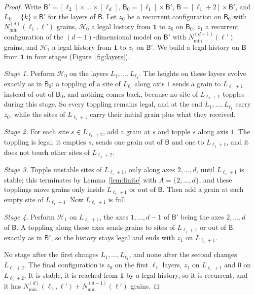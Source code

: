 \documentclass[11pt]{amsart}
\theoremstyle{definition}
\newcommand{\one}{\mathbf 1}
\newcommand{\Nmin}{N_{\min}}
\newcommand{\B}{\mathsf B}
\begin{document}
\begin{proof}
Write $\B'=[\ell_2]\times\dots\times[\ell_d]$, $\B_0=[\ell_1]\times\B'$, $\B=[\ell_1+2]\times\B'$, and $L_k=\{k\}\times\B'$ for the layers of $\B$. Let $z_0$ be a recurrent configuration on $\B_0$ with $\Nmin^{(d)}(\ell_1,\ell')$ grains, $\mathcal H_0$ a legal history from $\one$ to $z_0$ on $\B_0$, $z_1$ a recurrent configuration of the $(d-1)$-dimensional model on $\B'$ with $\Nmin^{(d-1)}(\ell')$ grains, and $\mathcal H_1$ a legal history from $\one$ to $z_1$ on $\B'$. We build a legal history on $\B$ from $\one$ in four stages (Figure~\ref{fig:layers}).

\emph{Stage 1.} Perform $\mathcal H_0$ on the layers $L_1,\dots,L_{\ell_1}$. The heights on these layers evolve exactly as in $\B_0$: a toppling of a site of $L_{\ell_1}$ along axis $1$ sends a grain to $L_{\ell_1+1}$ instead of out of $\B_0$, and nothing comes back, because no site of $L_{\ell_1+1}$ topples during this stage. So every toppling remains legal, and at the end $L_1,\dots,L_{\ell_1}$ carry $z_0$, while the sites of $L_{\ell_1+1}$ carry their initial grain plus what they received.

\emph{Stage 2.} For each site $s\in L_{\ell_1+2}$, add a grain at $s$ and topple $s$ along axis $1$. The toppling is legal, it empties $s$, sends one grain out of $\B$ and one to $L_{\ell_1+1}$, and it does not touch other sites of $L_{\ell_1+2}$.

\emph{Stage 3.} Topple unstable sites of $L_{\ell_1+1}$, only along axes $2,\dots,d$, until $L_{\ell_1+1}$ is stable; this terminates by Lemma~\ref{lem:finite} with $A=\{2,\dots,d\}$, and these topplings move grains only inside $L_{\ell_1+1}$ or out of $\B$. Then add a grain at each empty site of $L_{\ell_1+1}$. Now $L_{\ell_1+1}$ is full.

\emph{Stage 4.} Perform $\mathcal H_1$ on $L_{\ell_1+1}$, the axes $1,\dots,d-1$ of $\B'$ being the axes $2,\dots,d$ of $\B$. A toppling along these axes sends grains to sites of $L_{\ell_1+1}$ or out of $\B$, exactly as in $\B'$, so the history stays legal and ends with $z_1$ on $L_{\ell_1+1}$.

No stage after the first changes $L_1,\dots,L_{\ell_1}$, and none after the second changes $L_{\ell_1+2}$. The final configuration is $z_0$ on the first $\ell_1$ layers, $z_1$ on $L_{\ell_1+1}$ and $0$ on $L_{\ell_1+2}$. It is stable, it is reached from $\one$ by a legal history, so it is recurrent, and it has $\Nmin^{(d)}(\ell_1,\ell')+\Nmin^{(d-1)}(\ell')$ grains.
\end{proof}
\end{document}
